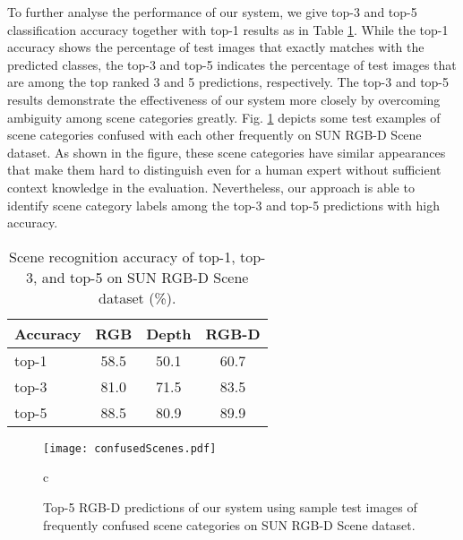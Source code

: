 To further analyse the performance of our system, we give top-3 and top-5 classification accuracy together with top-1 results as in Table \ref{table:top135sceneResults}. While the top-1 accuracy shows the percentage of test images that exactly matches with the predicted classes, the top-3 and top-5 indicates the percentage of test images that are among the top ranked 3 and 5 predictions, respectively. The top-3 and top-5 results demonstrate the effectiveness of our system more closely by overcoming ambiguity among scene categories greatly. Fig. \ref{fig:sunrgbdConfusedSamples} depicts some test examples of scene categories confused with each other frequently on SUN RGB-D Scene dataset. As shown in the figure, these scene categories have similar appearances that make them hard to distinguish even for a human expert without sufficient context knowledge in the evaluation. Nevertheless, our approach is able to identify scene category labels among the top-3 and top-5 predictions with high accuracy.
\begin{table}[!h]
	\caption{Scene recognition accuracy of top-1, top-3, and top-5 on SUN RGB-D Scene dataset (\%).}
	\begin{center}
		\setlength{\tabcolsep}{0.9em} \def\arraystretch{1.2}
		\begin{adjustbox}{width=0.65\columnwidth}
			\begin{tabular}{ lccc }
				\hline
				Accuracy			& RGB 				& Depth 			& RGB-D \\ \hline \hline
				top-1    			& 58.5 				& 50.1 	 			& 60.7 		\\ top-3    			& 81.0 				& 71.5 	 			& 83.5 		\\ top-5    			& 88.5 				& 80.9 	 			& 89.9 		\\ \hline
			\end{tabular}
		\end{adjustbox}
		\label{table:top135sceneResults}
	\end{center}
\end{table}
\begin{figure}[!t]
	\begin{center}
		\texttt{[image: confusedScenes.pdf]}
	\end{center}
c	\caption{Top-5 RGB-D predictions of our system using sample test images of frequently confused scene categories on SUN RGB-D Scene dataset.}
	\label{fig:sunrgbdConfusedSamples}
\end{figure}

